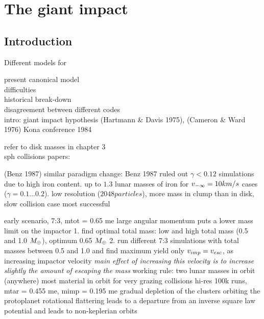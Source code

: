 \chapter{The giant impact}
\label{ch05}
\graphicspath{{./05figs/}}





\section{Introduction}
Different models for 

present canonical model\\
difficulties\\
historical break-down\\
disagreement between different codes\\


intro:
giant impact hypothesis \citep{1975Icar...24..504H} (Hartmann \& Davis 1975), \citep{1976LPI.....7..120C} (Cameron \& Ward 1976)
Kona conference 1984 \citep{1986ormo.conf.....H}

refer to disk masses in chapter 3\\

sph collisions papers:
\citep{Benz:1985p1755}


\citep{Benz:1989p1893}
(Benz 1987) \citep{1987Icar...71...30B} similar paradigm change: Benz 1987  ruled out $\gamma < 0.12$ simulations due to high iron content. up to $1.3$ lunar masses of iron for $v_{-\infty} = 10km/s$ cases ($\gamma = 0.1 \dots 0.2$). low resolution ($2048 particles$), more mass in clump than in disk, slow collision case most successful



\citep{Cameron:2000p1854}
early scenario, 7:3, mtot = 0.65 me
large angular momentum puts a lower mass limit on the impactor
1. find optimal total mass: low and high total mass (0.5 and 1.0 $M_{\oplus}$), optimum 0.65 $M_{\oplus}$
2. run different 7:3 simulations with total masses between 0.5 and 1.0 and find maximum yield
only $v_{imp} = v_{esc}$, as increasing impactor velocity \emph{main effect of increasing this velocity is to increase slightly the amount of escaping the mass}
working rule: two lunar masses in orbit (anywhere)
most material in orbit for very grazing collisions
hi-res 100k runs, mtar = 0.455 me, mimp = 0.195 me
gradual depletion of the clusters orbiting the protoplanet
rotational flattering leads to a departure from an inverse square law potential and leads to non-keplerian orbits


